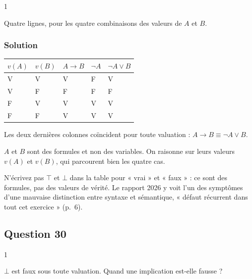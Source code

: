 \documentclass[11pt,a4paper]{article}
\begin{document}
\begin{indication}{1}

Quatre lignes, pour les quatre combinaisons des valeurs de \(A\) et \(B\).

\end{indication}

\hypertarget{solution-28}{%
\subsubsection{Solution}\label{solution-28}}

\begin{longtable}[]{@{}lllll@{}}
\toprule\noalign{}
\(v(A)\) & \(v(B)\) & \(A \to B\) & \(\neg A\) & \(\neg A \vee B\) \\
\midrule\noalign{}
\endhead
\bottomrule\noalign{}
\endlastfoot
V & V & V & F & V \\
V & F & F & F & F \\
F & V & V & V & V \\
F & F & V & V & V \\
\end{longtable}

Les deux dernières colonnes coïncident pour toute valuation : \(\boxed{A \to B \equiv \neg A \vee B}\).

\begin{piege}

\(A\) et \(B\) sont des formules et non des variables. On raisonne sur leurs valeurs \(v(A)\) et \(v(B)\), qui parcourent bien les quatre cas.

\end{piege}

\begin{piege}

N'écrivez pas \(\top\) et \(\bot\) dans la table pour « vrai » et « faux » : ce sont des formules, pas des valeurs de vérité. Le rapport 2026 y voit l'un des symptômes d'une mauvaise distinction entre syntaxe et sémantique, « défaut récurrent dans tout cet exercice » (p.~6).

\end{piege}

\hypertarget{question-30}{%
\subsection{Question 30}\label{question-30}}

\begin{indication}{1}

\(\bot\) est faux sous toute valuation. Quand une implication est-elle fausse ?

\end{indication}
\end{document}
